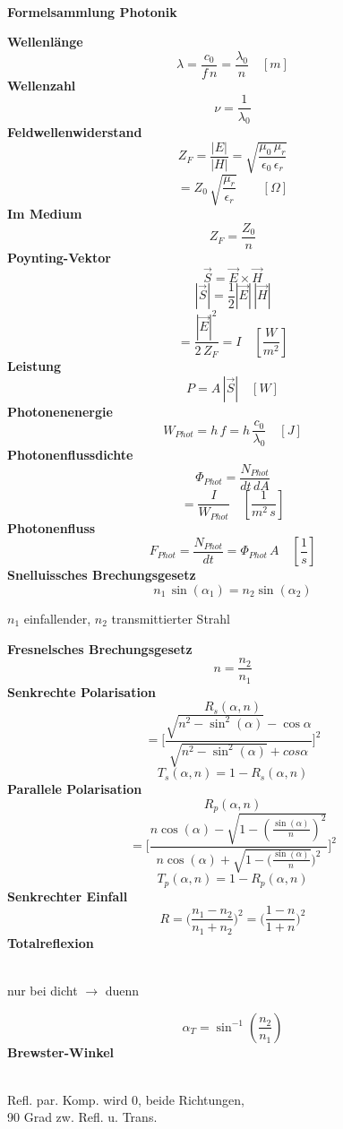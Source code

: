 \documentclass[12pt,a4paper,oneside]{article}
\begin{document}
	\setlength{\abovedisplayskip}{7pt}
	\setlength{\belowdisplayskip}{7pt}
	~
	\begin{center}
		\vspace{-1.0cm}
		{\Large \textbf{Formelsammlung Photonik}}
	\end{center}
	\setlength{\columnseprule}{0.1mm}
	\begin{multicols}{3}
		\textbf{Wellenlänge} $$\lambda=\frac{c_0}{f\, n} = \frac{\lambda_0}{n}\quad[m]$$
		\textbf{Wellenzahl} $$\nu = \frac{1}{\lambda_0}$$
		\textbf{Feldwellenwiderstand} $$Z_F=\frac{|E|}{|H|}=\sqrt{\frac{\mu_0 \, \mu_r}{\epsilon_0 \, \epsilon_r}}$$ $$= Z_0 \, \sqrt{\frac{\mu_r}{\epsilon_r}} \qquad[\Omega]$$
		\textbf{Im Medium} $$Z_F = \frac{Z_0}{n}$$
		\textbf{Poynting-Vektor} $$\vec{S}=\vec{E}\times\vec{H}$$ $$|\vec{S}|=\frac{1}{2}|\vec{E}|\,|\vec{H}|$$$$=\frac{|\vec{E}|^2}{2\,Z_F}=I\quad [\frac{W}{m^2}]$$
		\textbf{Leistung} $$P= A\, |\vec{S}|\quad [W]$$
		\textbf{Photonenenergie} $$W_{Phot}= h\,f=h\, \frac{c_0}{\lambda_0}\quad [J]$$
		\textbf{Photonenflussdichte} $$\Phi_{Phot}=\frac{N_{Phot}}{dt\,dA}$$ $$ = \frac{I}{W_{Phot}} \quad [\frac{1}{m^2\, s}]$$ 
		\textbf{Photonenfluss} $$F_{Phot} = \frac{N_{Phot }}{dt}= \Phi_{Phot} \, A \quad [\frac{1}{s}]	$$
 	\textbf{Snelluissches Brechungsgesetz}$$n_1 \, \sin(\alpha_1) = n_2 \sin(\alpha_2)$$\begin{tiny}
		$n_1$ einfallender, $n_2$ transmittierter Strahl
	\end{tiny}
	\textbf{Fresnelsches Brechungsgesetz }$$n = \frac{n_2 }{n_1}$$\textbf{Senkrechte Polarisation}$$R_s(\alpha, n)$$ $$= \bigg[\frac{\sqrt{n^2 - \sin^2(\alpha)}-\cos{\alpha}}{\sqrt{n^2 - \sin^2(\alpha)}+cos{\alpha}}\bigg]^2$$ $$T_s(\alpha, n) = 1- R_s(\alpha, n)$$
	\textbf{Parallele Polarisation} $$R_p(\alpha, n) $$ $$= \bigg[\frac{n \cos(\alpha)-\sqrt{1-(\frac{\sin(\alpha)}{n})^2}}{n \cos(\alpha)+\sqrt{1-(\frac{\sin(\alpha)}{n}})^2}\bigg]^2$$ $$T_p(\alpha, n) = 1 - R_p(\alpha, n)$$
	\textbf{Senkrechter Einfall}
	$$R = \big( \frac{n_1 - n_2}{n_1 + n_2}\big)^2 = \big( \frac{1- n }{1 + n}\big)^2$$
	\textbf{Totalreflexion} \begin{tiny}\\nur bei dicht $\rightarrow$ duenn
	\end{tiny}$$ \alpha_T = \sin^{-1}(\frac{n_2}{n_1})$$
	\textbf{Brewster-Winkel }\begin{tiny}\\Refl. par. Komp. wird 0, beide Richtungen, \\ 90 Grad zw. Refl. u. Trans.

\end{tiny}
\end{multicols}
\end{document}

